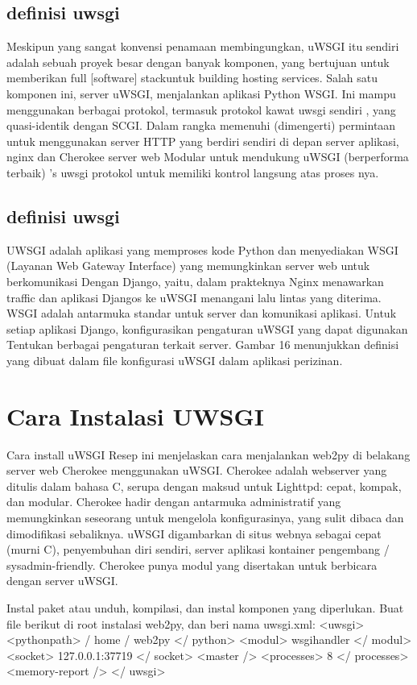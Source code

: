 \subsection{definisi uwsgi}
Meskipun yang sangat konvensi penamaan membingungkan, uWSGI itu sendiri adalah sebuah proyek besar dengan banyak komponen, yang bertujuan untuk memberikan full [software] stackuntuk building hosting services. Salah satu komponen ini, server uWSGI, menjalankan aplikasi Python WSGI. Ini mampu menggunakan berbagai protokol, termasuk protokol kawat uwsgi sendiri , yang quasi-identik dengan SCGI. Dalam rangka memenuhi (dimengerti) permintaan untuk menggunakan server HTTP yang berdiri sendiri di depan server aplikasi, nginx dan Cherokee server web Modular untuk mendukung uWSGI (berperforma terbaik) 's uwsgi protokol untuk memiliki kontrol langsung atas proses nya\cite{dong2015chemdes}.

\subsection{definisi uwsgi}
UWSGI adalah aplikasi yang memproses kode Python dan menyediakan WSGI (Layanan Web
Gateway Interface) yang memungkinkan server web untuk berkomunikasi
Dengan Django, yaitu, dalam prakteknya Nginx menawarkan traffic dan aplikasi Djangos ke uWSGI
menangani lalu lintas yang diterima. WSGI adalah antarmuka standar untuk server
dan komunikasi aplikasi.
Untuk setiap aplikasi Django, konfigurasikan pengaturan uWSGI yang dapat digunakan
Tentukan berbagai pengaturan terkait server. Gambar 16 menunjukkan
definisi yang dibuat dalam file konfigurasi uWSGI dalam aplikasi perizinan\cite{wood2018ccbuilder}.

\section{Cara Instalasi UWSGI}
Cara install uWSGI
Resep ini menjelaskan cara menjalankan web2py di belakang server web Cherokee menggunakan uWSGI.
Cherokee adalah webserver yang ditulis dalam bahasa C, serupa dengan maksud untuk Lighttpd: cepat, kompak, dan modular.
Cherokee hadir dengan antarmuka administratif yang memungkinkan seseorang untuk mengelola konfigurasinya,
yang sulit dibaca dan dimodifikasi sebaliknya. uWSGI digambarkan di situs webnya sebagai cepat
(murni C), penyembuhan diri sendiri, server aplikasi kontainer pengembang / sysadmin-friendly. Cherokee punya
modul yang disertakan untuk berbicara dengan server uWSGI.

Instal paket atau unduh, kompilasi, dan instal komponen yang diperlukan.
Buat file berikut di root instalasi web2py, dan beri nama uwsgi.xml:
<uwsgi>
<pythonpath> / home / web2py </ python>
<modul> wsgihandler </ modul>
<socket> 127.0.0.1:37719 </ socket>
<master />
<processes> 8 </ processes>
<memory-report />
</ uwsgi>

